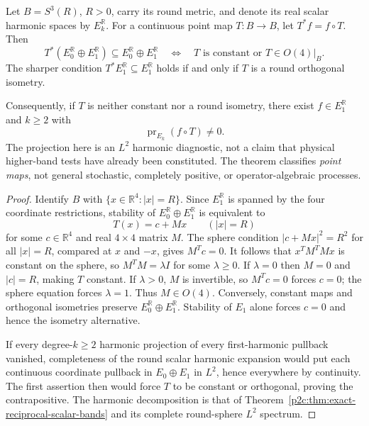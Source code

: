 \documentclass[12pt,a4paper]{article}
\begin{document}
\begin{theorem}
\label{p2c:thm:v280-first-band-rigidity}
Let $B=S^3(R)$, $R>0$, carry its round metric, and denote its real
scalar harmonic spaces by $E_k^{\mathbb R}$.  For a continuous point map
$T:B\to B$, let $T^*f=f\circ T$.  Then
\[
 \boxed{T^*(E_0^{\mathbb R}\oplus E_1^{\mathbb R})
 \subseteq E_0^{\mathbb R}\oplus E_1^{\mathbb R}}
 \quad\Longleftrightarrow\quad
 \boxed{T\text{ is constant or }T\in O(4)|_B.}
 \tag{FB-RIG}
\]
The sharper condition $T^*E_1^{\mathbb R}\subseteq E_1^{\mathbb R}$
holds if and only if $T$ is a round orthogonal isometry.

Consequently, if $T$ is neither constant nor a round isometry, there
exist $f\in E_1^{\mathbb R}$ and $k\ge2$ with
\[
 \boxed{\operatorname{pr}_{E_k}(f\circ T)\ne0.}
 \tag{FB-LEAK}
\]
The projection here is an $L^2$ harmonic diagnostic, not a claim that
physical higher-band tests have already been constituted.  The theorem
classifies \emph{point maps}, not general stochastic, completely positive,
or operator-algebraic processes.
\end{theorem}
\begin{proof}
Identify $B$ with $\{x\in\mathbb R^4:|x|=R\}$.  Since $E_1^{\mathbb R}$
is spanned by the four coordinate restrictions, stability of
$E_0^{\mathbb R}\oplus E_1^{\mathbb R}$ is equivalent to
\[
 T(x)=c+Mx \qquad(|x|=R)
\]
for some $c\in\mathbb R^4$ and real $4\times4$ matrix $M$.  The sphere
condition $|c+Mx|^2=R^2$ for all $|x|=R$, compared at $x$ and $-x$,
gives $M^Tc=0$.  It follows that $x^TM^TMx$ is constant on the sphere,
so $M^TM=\lambda I$ for some $\lambda\ge0$.  If $\lambda=0$ then $M=0$
and $|c|=R$, making $T$ constant.  If $\lambda>0$, $M$ is invertible,
so $M^Tc=0$ forces $c=0$; the sphere equation forces $\lambda=1$.
Thus $M\in O(4)$.  Conversely, constant maps and orthogonal isometries
preserve $E_0^{\mathbb R}\oplus E_1^{\mathbb R}$.  Stability of $E_1$
alone forces $c=0$ and hence the isometry alternative.

If every degree-$k\ge2$ harmonic projection of every first-harmonic
pullback vanished, completeness of the round scalar harmonic expansion
would put each continuous coordinate pullback in $E_0\oplus E_1$ in
$L^2$, hence everywhere by continuity.  The first assertion then
would force $T$ to be constant or orthogonal, proving the contrapositive.
The harmonic decomposition is that of
Theorem~\ref{p2c:thm:exact-reciprocal-scalar-bands} and its complete
round-sphere $L^2$ spectrum.
\end{proof}
\end{document}
